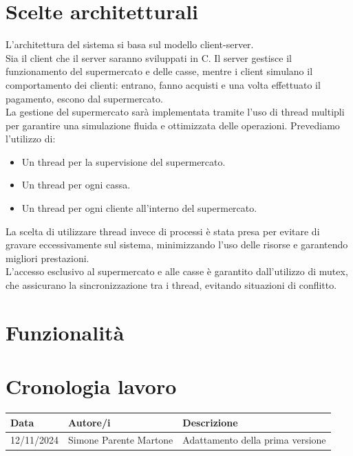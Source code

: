 \documentclass[a4paper, 12pt]{article}
\begin{document}
\section{Scelte architetturali}
L'architettura del sistema si basa sul modello client-server. \\
Sia il client che il server saranno sviluppati in C. Il server gestisce il
funzionamento del supermercato e delle casse, mentre i client simulano il 
comportamento dei clienti: entrano, fanno acquisti e una volta effettuato il 
pagamento, escono dal supermercato. \\
La gestione del supermercato sarà implementata tramite l'uso di thread multipli
per garantire una simulazione fluida e ottimizzata delle operazioni.
Prevediamo l'utilizzo di:
\begin{itemize}[noitemsep,topsep=0pt,parsep=0pt,partopsep=0pt]
    \item Un thread per la supervisione del supermercato.
    \item Un thread per ogni cassa.
    \item Un thread per ogni cliente all'interno del supermercato.
\end{itemize}

La scelta di utilizzare thread invece di processi è stata presa per evitare di
gravare eccessivamente sul sistema, minimizzando l'uso delle risorse e garantendo
migliori prestazioni. \\
L'accesso esclusivo al supermercato e alle casse è garantito dall'utilizzo di 
mutex, che assicurano la sincronizzazione tra i thread, evitando situazioni di
conflitto.
\section{Funzionalità}

\section{Cronologia lavoro}

\begin{center}
    \begin{tabular}{lll}
        \hline
        \textbf{Data} & \textbf{Autore/i} & \textbf{Descrizione} \\
        \hline
        12/11/2024 & Simone Parente Martone & Adattamento della prima versione \\
        \hline
    \end{tabular}
    \end{center}
    
\end{document}
